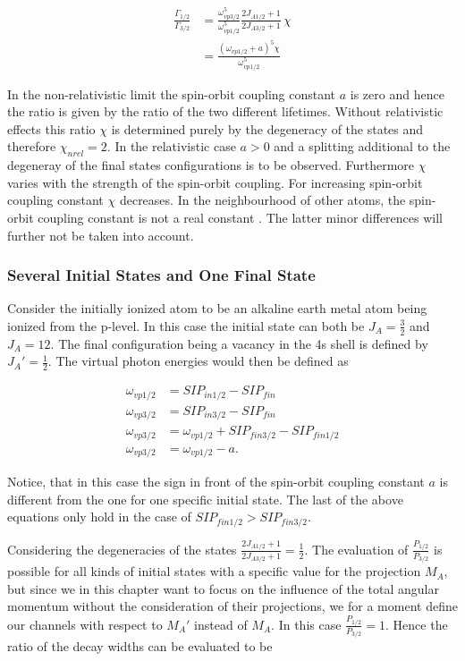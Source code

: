 \begin{align}
  \frac{\Gamma_{1/2}}{\Gamma_{3/2}}
  &= \frac{\omega_{vp3/2}^5}{\omega_{vp1/2}^5} \frac{2J_{A1/2}+1}{2J_{A3/2}+1} \,\chi\\
  &= \frac{(\omega_{vp1/2} +a)^5 \chi}{\omega_{vp1/2}^5}
\end{align}

In the non-relativistic limit the spin-orbit coupling constant $a$ is zero and
hence the ratio is given by the ratio of the two different lifetimes. Without
relativistic effects this ratio $\chi$ is determined purely by the degeneracy
of the states and therefore $\chi_{nrel} = 2$.
In the relativistic case $a>0$ and a splitting additional to the degeneray of
the final states configurations is to be observed. Furthermore $\chi$ varies
with the strength of the spin-orbit coupling. For increasing spin-orbit coupling
constant $\chi$ decreases.
In the neighbourhood of other atoms, the spin-orbit coupling constant is not
a real constant \cite{}. The latter minor differences will further not be taken
into account.




\subsubsection{Several Initial States and One Final State}
Consider the initially ionized atom to be an alkaline earth metal atom
being ionized from the
p-level. In this case the initial state can both be $J_A = \frac 32$ and
$J_A = 12$. The final configuration being a vacancy in the 4s shell is defined
by $J_A'= \frac 12$.
The virtual photon energies would then be defined as

\begin{align}
  \omega_{vp1/2} &= SIP_{in1/2} - SIP_{fin}  \\
  \omega_{vp3/2} &= SIP_{in3/2} - SIP_{fin}  \\
  \omega_{vp3/2} &= \omega_{vp1/2} + SIP_{fin3/2} - SIP_{fin1/2} \\
  \omega_{vp3/2} &= \omega_{vp1/2} - a .
\end{align}

Notice, that in this case the sign in front of the spin-orbit coupling
constant $a$ is different from the one for one specific initial state.
The last of the above equations only hold in the case of
$SIP_{fin1/2} > SIP_{fin3/2}$.

Considering the degeneracies of the states
$\frac{2J_{A1/2}+1}{2J_{A3/2}+1} = \frac 12$.
The evaluation of $\frac{P_{1/2}}{P_{3/2}}$ is possible for all kinds
of initial states with a specific value for the projection $M_A$, but
since we in this chapter want to focus on the influence of the total
angular momentum without the consideration of their projections, we
for a moment define our channels with respect to $M_A'$ instead of
$M_A$. In this case $\frac{P_{1/2}}{P_{3/2}} = 1$.
Hence the ratio of the decay widths can be evaluated to be

